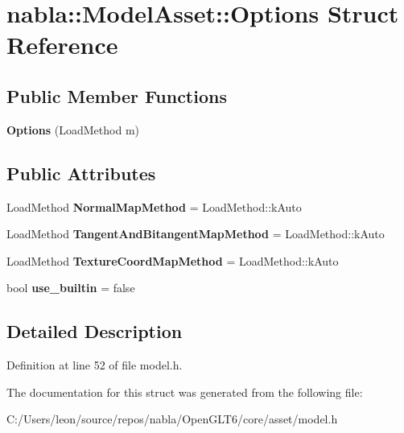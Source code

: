 \hypertarget{structnabla_1_1_model_asset_1_1_options}{}\section{nabla\+::Model\+Asset\+::Options Struct Reference}
\label{structnabla_1_1_model_asset_1_1_options}
\subsection*{Public Member Functions}
\begin{DoxyCompactItemize}
\item 
\mbox{\label{structnabla_1_1_model_asset_1_1_options_a002eef6b917e70582e297296ae74b247}} 
{\bfseries Options} (Load\+Method m)
\end{DoxyCompactItemize}
\subsection*{Public Attributes}
\begin{DoxyCompactItemize}
\item 
\mbox{\label{structnabla_1_1_model_asset_1_1_options_a4371c771083405d7f09b0bd59ef5f82d}} 
Load\+Method {\bfseries Normal\+Map\+Method} = Load\+Method\+::k\+Auto
\item 
\mbox{\label{structnabla_1_1_model_asset_1_1_options_a38ef375251ba322af56486ee3865fda9}} 
Load\+Method {\bfseries Tangent\+And\+Bitangent\+Map\+Method} = Load\+Method\+::k\+Auto
\item 
\mbox{\label{structnabla_1_1_model_asset_1_1_options_a65d7718f1b9fdc47fbe13de1486a3001}} 
Load\+Method {\bfseries Texture\+Coord\+Map\+Method} = Load\+Method\+::k\+Auto
\item 
\mbox{\label{structnabla_1_1_model_asset_1_1_options_a029654e591688ecd28e597bf68fc581c}} 
bool {\bfseries use\+\_\+builtin} = false
\end{DoxyCompactItemize}


\subsection{Detailed Description}


Definition at line 52 of file model.\+h.



The documentation for this struct was generated from the following file\+:\begin{DoxyCompactItemize}
\item 
C\+:/\+Users/leon/source/repos/nabla/\+Open\+G\+L\+T6/core/asset/model.\+h\end{DoxyCompactItemize}
